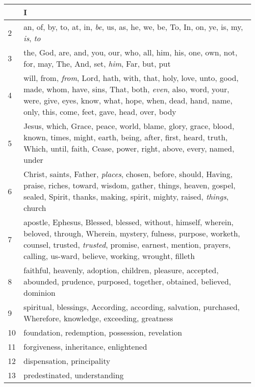 \begin{center}
\begin{longtable}{l|p{3.75in}}
\hline \hline 
\endlastfoot 
1 & I\\ \hline 
2 & an, of, by, to, at, in, \emph{be}, us, as, he, we, be, To, In, on, ye, is, my, \emph{is}, \emph{to}\\ \hline 
3 & the, God, are, and, you, our, who, all, him, his, one, own, not, for, may, The, And, set, \emph{him}, Far, but, put\\ \hline 
4 & will, from, \emph{from}, Lord, hath, with, that, holy, love, unto, good, made, whom, have, sins, That, both, \emph{even}, also, word, your, were, give, eyes, know, what, hope, when, dead, hand, name, only, this, come, feet, gave, head, over, body\\ \hline 
5 & Jesus, which, Grace, peace, world, blame, glory, grace, blood, known, times, might, earth, being, after, first, heard, truth, Which, until, faith, Cease, power, right, above, every, named, under\\ \hline 
6 & Christ, saints, Father, \emph{places}, chosen, before, should, Having, praise, riches, toward, wisdom, gather, things, heaven, gospel, sealed, Spirit, thanks, making, spirit, mighty, raised, \emph{things}, church\\ \hline 
7 & apostle, Ephesus, Blessed, blessed, without, himself, wherein, beloved, through, Wherein, mystery, fulness, purpose, worketh, counsel, trusted, \emph{trusted}, promise, earnest, mention, prayers, calling, us-ward, believe, working, wrought, filleth\\ \hline 
8 & faithful, heavenly, adoption, children, pleasure, accepted, abounded, prudence, purposed, together, obtained, believed, dominion\\ \hline 
9 & spiritual, blessings, According, according, salvation, purchased, Wherefore, knowledge, exceeding, greatness\\ \hline 
10 & foundation, redemption, possession, revelation\\ \hline 
11 & forgiveness, inheritance, enlightened\\ \hline 
12 & dispensation, principality\\ \hline 
13 & predestinated, understanding\\ \hline 
\end{longtable} 
\end{center} 




 
